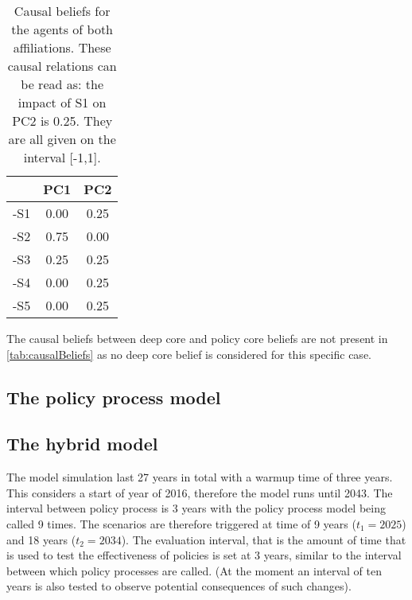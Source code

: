 \documentclass[12pt]{article}
\begin{document}

\begin{table}
\begin{center}
\begin{tabular}{ |c|c|c|}
 \hline
 	& PC1	& PC2		\\ \hline \hline
-S1 	& 0.00	& 0.25		\\ \hline
-S2 	& 0.75	& 0.00		\\ \hline
-S3 	& 0.25	& 0.25		\\ \hline
-S4 	& 0.00	& 0.25		\\ \hline
-S5 	& 0.00	& 0.25		\\ 
 \hline
\end{tabular}
\end{center}
\caption{Causal beliefs for the agents of both affiliations. These causal relations can be read as: the impact of S1 on PC2 is 0.25. They are all given on the interval [-1,1].}
\label{tab:causalBeliefs}
\end{table}

The causal beliefs between deep core and policy core beliefs are not present in \autoref{tab:causalBeliefs} as no deep core belief is considered for this specific case.


\subsection{The policy process model}




\subsection{The hybrid model}

The model simulation last 27 years in total with a warmup time of three years. This considers a start of year of 2016, therefore the model runs until 2043. The interval between policy process is 3 years with the policy process model being called 9 times. The scenarios are therefore triggered at time of 9 years ($t_1 = 2025$) and 18 years ($t_2 = 2034$). The evaluation interval, that is the amount of time that is used to test the effectiveness of policies is set at 3 years, similar to the interval between which policy processes are called. (At the moment an interval of ten years is also tested to observe potential consequences of such changes).
\end{document}

